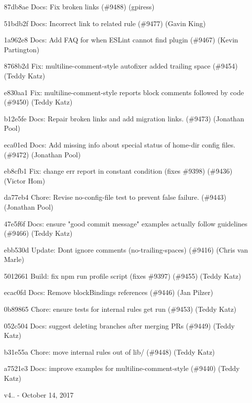 \begin{DoxyItemize}
\item 87db8ae Docs\+: Fix broken links (\#9488) (gpiress)
\item 51bdb2f Docs\+: Incorrect link to related rule (\#9477) (Gavin King)
\item 1a962e8 Docs\+: Add FAQ for when ESLint cannot find plugin (\#9467) (Kevin Partington)
\item 8768b2d Fix\+: multiline-\/comment-\/style autofixer added trailing space (\#9454) (Teddy Katz)
\item e830aa1 Fix\+: multiline-\/comment-\/style reports block comments followed by code (\#9450) (Teddy Katz)
\item b12e5fe Docs\+: Repair broken links and add migration links. (\#9473) (Jonathan Pool)
\item eca01ed Docs\+: Add missing info about special status of home-\/dir config files. (\#9472) (Jonathan Pool)
\item eb8cfb1 Fix\+: change err report in constant condition (fixes \#9398) (\#9436) (Victor Hom)
\item da77eb4 Chore\+: Revise no-\/config-\/file test to prevent false failure. (\#9443) (Jonathan Pool)
\item 47e5f6f Docs\+: ensure "{}good commit message"{} examples actually follow guidelines (\#9466) (Teddy Katz)
\item ebb530d Update\+: Don\textquotesingle{}t ignore comments (no-\/trailing-\/spaces) (\#9416) (Chris van Marle)
\item 5012661 Build\+: fix {\ttfamily npm run profile} script (fixes \#9397) (\#9455) (Teddy Katz)
\item ecac0fd Docs\+: Remove block\+Bindings references (\#9446) (Jan Pilzer)
\item 0b89865 Chore\+: ensure tests for internal rules get run (\#9453) (Teddy Katz)
\item 052c504 Docs\+: suggest deleting branches after merging PRs (\#9449) (Teddy Katz)
\item b31e55a Chore\+: move internal rules out of lib/ (\#9448) (Teddy Katz)
\item a7521e3 Docs\+: improve examples for multiline-\/comment-\/style (\#9440) (Teddy Katz)
\end{DoxyItemize}

v4.. -\/ October 14, 2017


